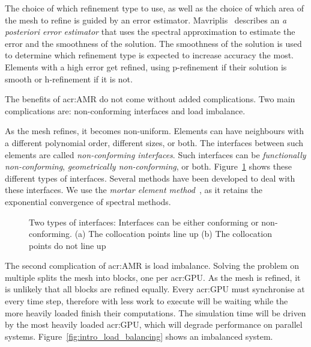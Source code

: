The choice of which refinement type to use, as well as the choice of which area of the mesh to
refine is guided by an error estimator. Mavriplis~\cite{Mavriplis1990} describes an \textit{a
posteriori error estimator} that uses the spectral approximation to estimate the error and the
smoothness of the solution. The smoothness of the solution is used to determine which refinement
type is expected to increase accuracy the most. Elements with a high error get refined, using
p-refinement if their solution is smooth or h-refinement if it is not.

The benefits of \acrshort{acr:AMR} do not come without added complications. Two main complications
are: non-conforming interfaces and load imbalance.

As the mesh refines, it becomes non-uniform. Elements can have neighbours with a different
polynomial order, different sizes, or both. The interfaces between such elements are called
\textit{non-conforming interfaces}. Such interfaces can be \textit{functionally non-conforming},
\textit{geometrically non-conforming}, or both. Figure~\ref{fig:intro_interfaces} shows these
different types of interfaces. Several methods have been developed to deal with these interfaces. We
use the \textit{mortar element method}~\cite{Maday1989}, as it retains the exponential convergence
of spectral methods.

\begin{figure}[H]
	\centering
	\hfill
	\caption{Two types of interfaces: Interfaces can be either conforming or non-conforming. (a) The collocation points line up (b) The collocation points do not line up}\label{fig:intro_interfaces}
\end{figure}

The second complication of \acrshort{acr:AMR} is load imbalance. Solving the problem on multiple
 splits the mesh into blocks, one per \acrshort{acr:GPU}. As the mesh is
refined, it is unlikely that all blocks are refined equally. Every \acrshort{acr:GPU} must
synchronise at every time step, therefore  with less work to execute will be
waiting while the more heavily loaded  finish their computations. The simulation
time will be driven by the most heavily loaded \acrshort{acr:GPU}, which will degrade performance on
parallel systems. Figure~\ref{fig:intro_load_balancing} shows an imbalanced system.


